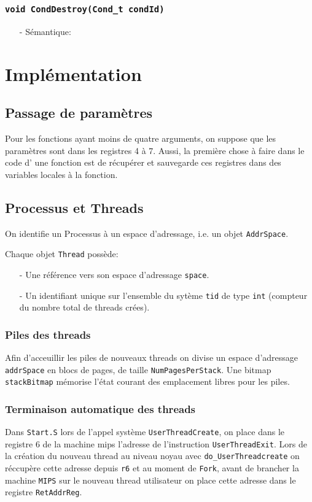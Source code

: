 \documentclass[11pt]{article}
\begin{document}
\subsubsection{\texttt{void CondDestroy(Cond\_t condId)}}
\begin{itemize}
\item[-]Sémantique: 
\end{itemize}




\section{Implémentation}
\subsection{Passage de paramètres}
Pour les fonctions ayant moins de quatre arguments, on suppose que les paramètres sont dans les registres 4 à 7.
Aussi, la première chose à faire dans le code d' une fonction est de récupérer et sauvegarde ces registres dans des variables locales à la fonction.

\subsection{Processus et Threads}
On identifie un Processus à un espace d'adressage, i.e. un objet \texttt{AddrSpace}.

Chaque objet \texttt{Thread} possède:
\begin{itemize}
\item[-] Une référence vers son espace d'adressage \texttt{space}.
\item[-] Un identifiant unique sur l'ensemble du sytème \texttt{tid} de type \texttt{int} (compteur du nombre
  total de threads crées).
\end{itemize}

\subsubsection{Piles des threads}
Afin d'acceuillir les piles de nouveaux threads on divise un espace d'adressage \texttt{addrSpace}
en blocs de pages, de taille \texttt{NumPagesPerStack}.
Une bitmap \texttt{stackBitmap} mémorise l'état courant des emplacement libres pour les piles.

\subsubsection{Terminaison automatique des threads}
Dans \texttt{Start.S} lors de l'appel système \texttt{UserThreadCreate}, on place dans le registre 6 de la machine mips l'adresse de l'instruction \texttt{UserThreadExit}.
Lors de la création du nouveau thread au niveau noyau avec \texttt{do\_UserThreadcreate} on réccupère
cette adresse depuis \texttt{r6} et au moment de \texttt{Fork}, avant de brancher la machine \texttt{MIPS} sur
le nouveau thread utilisateur on place cette adresse dans le registre \texttt{RetAddrReg}.
\end{document}
